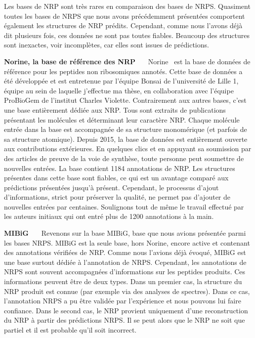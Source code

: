 \label{bdd_nrp}

Les bases de NRP sont très rares en comparaison des bases de NRPS.
Quasiment toutes les bases de NRPS que nous avons précédemment présentées comportent également les structures de NRP prédits.
Cependant, comme nous l'avons déjà dit plusieurs fois, ces données ne sont pas toutes fiables.
Beaucoup des structures sont inexactes, voir incomplètes, car elles sont issues de prédictions.

\textbf{Norine, la base de référence des NRP}~~~
Norine~\cite{caboche_norine:_2008,flissi_norine_2016} est la base de données de référence pour les peptides non ribosomiques annotés.
Cette base de données a été développée et est entretenue par l'équipe Bonsai de l'université de Lille 1, équipe au sein de laquelle j'effectue ma thèse, en collaboration avec l'équipe ProBioGem de l'institut Charles Violette.
Contrairement aux autres bases, c'est une base entièrement dédiée aux NRP.
Tous sont extraits de publications présentant les molécules et déterminant leur caractère NRP.
Chaque molécule entrée dans la base est accompagnée de sa structure monomérique (et parfois de sa structure atomique).
Depuis 2015, la base de données est entièrement ouverte aux contributions extérieures.
En quelques clics et en appuyant sa soumission par des articles de preuve de la voie de synthèse, toute personne peut soumettre de nouvelles entrées.
La base contient 1184 annotations de NRP.
Les structures présentes dans cette base sont fiables, ce qui est un avantage comparé aux prédictions présentées jusqu'à présent.
Cependant, le processus d'ajout d'informations, strict pour préserver la qualité, ne permet pas d'ajouter de nouvelles entrées par centaines.
Soulignons tout de même le travail effectué par les auteurs initiaux qui ont entré plus de 1200 annotations à la main.


\textbf{MIBiG}~~~
Revenons sur la base MIBiG, base que nous avions présentée parmi les bases NRPS.
MIBiG est la seule base, hors Norine, encore active et contenant des annotations vérifiées de NRP.
Comme nous l'avions déjà évoqué, MIBiG est une base surtout dédiée à l'annotation de NRPS.
Cependant, les annotations de NRPS sont souvent accompagnées d'informations sur les peptides produits.
Ces informations peuvent être de deux types.
Dans un premier cas, la structure du NRP produit est connue (par exemple via des analyses de spectres).
Dans ce cas, l'annotation NRPS a pu être validée par l'expérience et nous pouvons lui faire confiance.
Dans le second cas, le NRP provient uniquement d'une reconstruction du NRP à partir des prédictions NRPS.
Il se peut alors que le NRP ne soit que partiel et il est probable qu'il soit incorrect.

